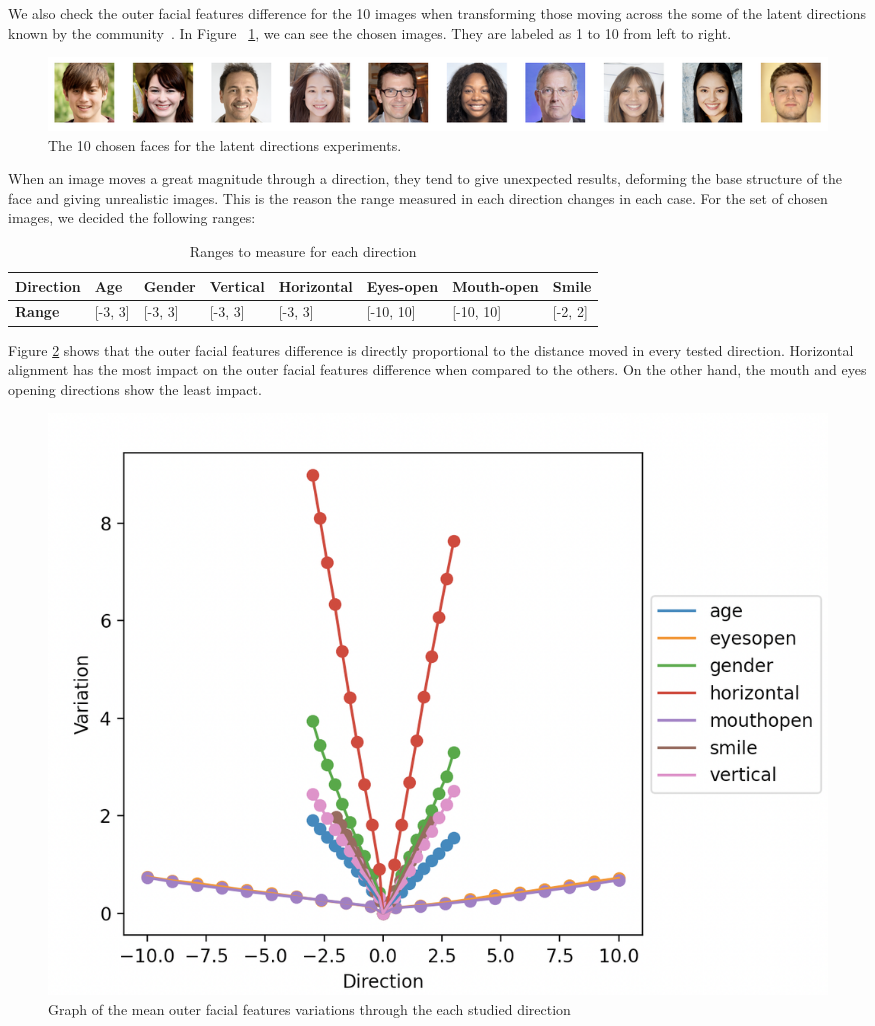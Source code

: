\documentclass[review]{elsarticle}
\begin{document}
We also check the outer facial features difference for the 10 images when transforming those moving across the some of the latent directions known by the community~\citep{Luxemburg_2019}. In Figure ~\ref{fig:samples}, we can see the chosen images. They are labeled as 1 to 10 from left to right.

\begin{figure}[H]
  \includegraphics[width=\linewidth, center]{Images/sample_faces.png}
  \caption{The 10 chosen faces for the latent directions experiments.}
  \label{fig:samples}
\end{figure}

When an image moves a great magnitude through a direction, they tend to give unexpected results, deforming the base structure of the face and giving unrealistic images. This is the reason the range measured in each direction changes in each case. For the set of chosen images, we decided the following ranges:

\begin{table}[H]
\centering
\begin{tabular}{|l|l|l|l|l|l|l|l|}
\hline
\textbf{Direction} & Age & Gender & Vertical & Horizontal & Eyes-open & Mouth-open & Smile \\ \hline
\textbf{Range} & [-3, 3] & [-3, 3] & [-3, 3] & [-3, 3] & [-10, 10] & [-10, 10] & [-2, 2] \\ \hline
\end{tabular}
    \caption{Ranges to measure for each direction}
  \label{table:ranges}
\end{table}

Figure \ref{fig:graph_means} shows that the outer facial features difference is directly proportional to the distance moved in every tested direction. Horizontal alignment has the most impact on the outer facial features difference when compared to the others. On the other hand, the mouth and eyes opening directions show the least impact.

\begin{figure}[H]
  \includegraphics[width=0.8\linewidth, center]{Images/graph_means.png}
  \caption{Graph of the mean outer facial features variations through the each studied direction}
  \label{fig:graph_means}
\end{figure} 
\end{document}
